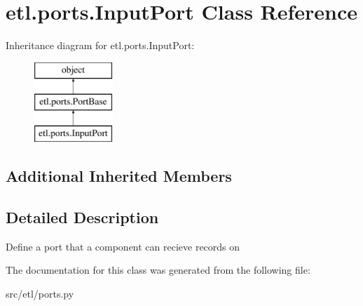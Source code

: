 \hypertarget{classetl_1_1ports_1_1InputPort}{\section{etl.\-ports.\-Input\-Port Class Reference}
\label{classetl_1_1ports_1_1InputPort}
}
Inheritance diagram for etl.\-ports.\-Input\-Port\-:\begin{figure}[H]
\begin{center}
\leavevmode
\includegraphics[height=3.000000cm]{classetl_1_1ports_1_1InputPort}
\end{center}
\end{figure}
\subsection*{Additional Inherited Members}


\subsection{Detailed Description}
\begin{DoxyVerb}Define a port that a component can recieve records on\end{DoxyVerb}
 

The documentation for this class was generated from the following file\-:\begin{DoxyCompactItemize}
\item 
src/etl/ports.\-py\end{DoxyCompactItemize}
